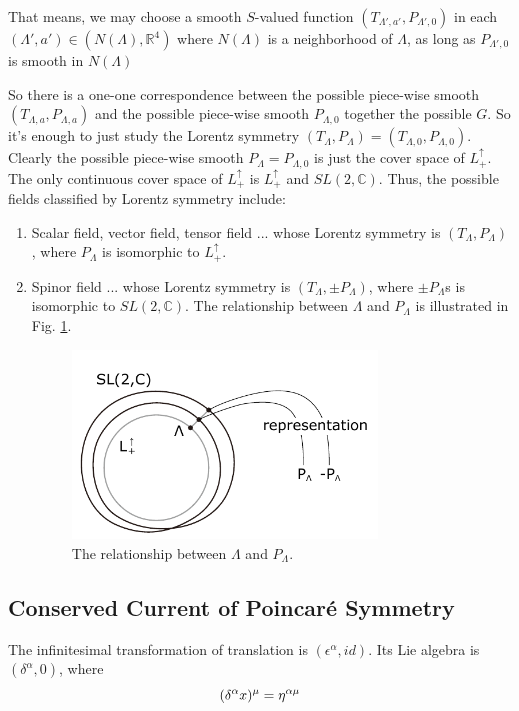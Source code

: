 \documentclass[12pt]{book}
\begin{document}
	 That means, we may choose a smooth $S$-valued function $(T_{\Lambda',a'},P_{\Lambda',0})$ in each $(\Lambda',a')\in(N(\Lambda),\mathbb R^4)$ where $N(\Lambda)$ is a neighborhood of $\Lambda$, as long as $P_{\Lambda',0}$ is smooth in $N(\Lambda)$
	
	So there is a one-one correspondence between the possible piece-wise smooth $(T_{\Lambda,a},P_{\Lambda,a})$ and the possible piece-wise smooth $P_{\Lambda,0}$ together the possible $G$. So it's enough to just study the Lorentz symmetry $(T_\Lambda,P_\Lambda)=(T_{\Lambda,0},P_{\Lambda,0}).$ Clearly the possible piece-wise smooth $P_{\Lambda}=P_{\Lambda,0}$ is just the cover space of $L_+^\uparrow$. The only continuous cover space of $L_+^\uparrow$ is $L_+^\uparrow$ and $SL(2,\mathbb C)$.  Thus, the possible fields classified by Lorentz symmetry include:
	\begin{enumerate}
		\item Scalar field, vector field, tensor field ... whose Lorentz symmetry is $(T_\Lambda,P_\Lambda)$, where $P_\Lambda$ is isomorphic to $L_+^\uparrow$.
		\item Spinor field ... whose Lorentz symmetry is $(T_\Lambda,\pm P_\Lambda)$, where $\pm P_\Lambda$s is isomorphic to $SL(2,\mathbb C)$. The relationship between $\Lambda$ and $P_\Lambda$ is illustrated in Fig. \ref{fig:lorentz}.
		\begin{figure}[htb]
			\centering  
			\includegraphics[width=230pt]{resources/chap_classical/1_7_lorentz.pdf}
			\caption{The relationship between $\Lambda$ and $P_\Lambda$.}
			\label{fig:lorentz} 
		\end{figure}
	\end{enumerate} 

	
	\subsection{Conserved Current of Poincar\'e Symmetry}
	The infinitesimal transformation of translation is $(\epsilon^\alpha,id)$. Its Lie algebra is $(\delta^\alpha,0)$, where
	\begin{equation}
		(\delta^\alpha x)^\mu=\eta^{\alpha\mu}\\
	\end{equation}
	
\end{document}
